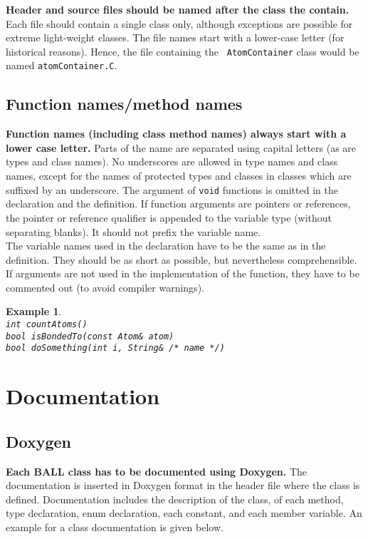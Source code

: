 \documentclass[a4paper,10pt]{article}
\newtheorem{example}{Example}
\begin{document}
{\bf Header and source files should be named after the class the contain.}
Each file should contain a single class only, although exceptions are possible
for extreme light-weight classes. The file names start with a lower-case
letter (for historical reasons). Hence, the file containing the {\tt
AtomContainer} class would be named {\tt atomContainer.C}.

\subsection{Function names/method names}

{\bf Function names (including class method names) always start with a lower case
letter.} Parts of the name are separated using capital letters (as are types
and class names). No underscores are allowed in type names and class names,
except for the names of protected types and classes in classes which are
suffixed by an underscore. The argument of {\tt void} functions is omitted in
the declaration and the definition. If function arguments are pointers or
references, the pointer or reference qualifier is appended to the variable
type (without separating blanks). It should not prefix the variable name.\\
The variable names used in the declaration have to be the same as in the
definition. They should be as short as possible, but nevertheless
comprehensible.  If arguments are not used in the implementation of the
function, they have to be commented out (to avoid compiler warnings).
\begin{example}\hspace*{2mm}\\
{\tt int countAtoms()}\\
{\tt bool isBondedTo(const Atom\& atom)}\\
{\tt bool doSomething(int i, String\& /* name */)}
\end{example}

\section{Documentation}

\subsection{Doxygen}
{\bf Each BALL class has to be documented using Doxygen.} The documentation is
inserted in Doxygen format in the header file where the class is defined.
Documentation includes the description of the class, of each method, type
declaration, enum declaration, each constant, and each member variable.
An example for a class documentation is given below. 
\end{document}
